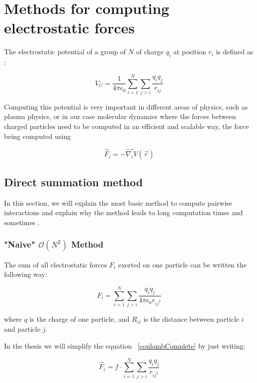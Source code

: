 \documentclass[12pt,twoside,a4paper]{report}
\begin{document}
\chapter{Methods for computing electrostatic forces}

The electrostatic potential of a group of $N$ of charge $q_i$ at position $r_i$ is defined as :

\begin{equation}
V_C = \frac{1}{4\pi\epsilon_0} \sum\limits_{i=1}^{N}\sum\limits_{j>i} \frac{q_i q_j}{r_{ij}}
\end{equation}

Computing this potential is very important in different areas of physics, such as plasma physics, or in our case molecular dynamics where the forces between charged particles need to be computed in an efficient and scalable way, the force being computed using

\begin{equation}
	\vec{F}_i = - \vec{\nabla_i} V(\vec{r})
\end{equation}


\section{Direct summation method }


In this section, we will explain the most basic method to compute pairwise interactions and explain why the method leads to long computation times and sometimes .

\subsection{"Naive" $\mathcal{O}(N^2)$ Method}

The sum of all electrostatic forces $F_i$ exerted  on one particle can be written the following way:

\begin{equation}
	F_i =  \sum\limits_{i=1}^{N}\sum\limits_{j>i} \frac{q_i q_j}{4\pi\epsilon_0 r_{ij^2}}
	\label{coulombComplete}
\end{equation}

where $q$ is the charge of one particle, and $R_{ij}$ is the distance between particle $i$ and particle $j$.

In the thesis we will simplify the equation ~\eqref{coulombComplete} by just writing:

\begin{equation}
	\vec{F}_i =  f\cdot\sum\limits_{i=1}^{N}\sum\limits_{j>i} \frac{q_i q_j}{r_{ij^2}}
	\label{coulombSimplified}
\end{equation}
\end{document}
